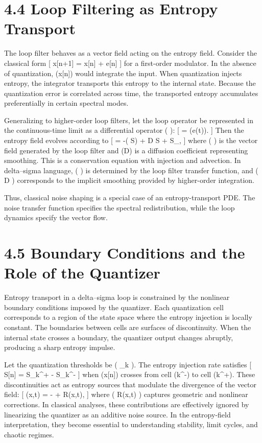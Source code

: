 \section*{4.4 Loop Filtering as Entropy Transport}

The loop filter behaves as a vector field acting on the entropy field. Consider the classical form
[
x[n+1] = x[n] + e[n]
]
for a first-order modulator. In the absence of quantization, (x[n]) would integrate the input. When quantization injects entropy, the integrator transports this entropy to the internal state. Because the quantization error is correlated across time, the transported entropy accumulates preferentially in certain spectral modes.

Generalizing to higher-order loop filters, let the loop operator be represented in the continuous-time limit as a differential operator (  ):
[
 = (e(t)).
]
Then the entropy field evolves according to
[
 = -\nabla \cdot ( S) + D \Delta S + \Delta S_{},
]
where (  ) is the vector field generated by the loop filter and (D) is a diffusion coefficient representing smoothing. This is a conservation equation with injection and advection. In delta--sigma language, (  ) is determined by the loop filter transfer function, and ( D ) corresponds to the implicit smoothing provided by higher-order integration.

Thus, classical noise shaping is a special case of an entropy-transport PDE. The noise transfer function specifies the spectral redistribution, while the loop dynamics specify the vector flow.

\section*{4.5 Boundary Conditions and the Role of the Quantizer}

Entropy transport in a delta--sigma loop is constrained by the nonlinear boundary conditions imposed by the quantizer. Each quantization cell corresponds to a region of the state space where the entropy injection is locally constant. The boundaries between cells are surfaces of discontinuity. When the internal state crosses a boundary, the quantizer output changes abruptly, producing a sharp entropy impulse.

Let the quantization thresholds be ( {\tau_k} ). The entropy injection rate satisfies
[
\Delta S[n] = S_{k^+} - S_{k^-}
]
when (x[n]) crosses from cell (k^-) to cell (k^+). These discontinuities act as entropy sources that modulate the divergence of the vector field:
[
\nabla \cdot {}(x,t) = - + R(x,t),
]
where ( R(x,t) ) captures geometric and nonlinear corrections. In classical analyses, these contributions are effectively ignored by linearizing the quantizer as an additive noise source. In the entropy-field interpretation, they become essential to understanding stability, limit cycles, and chaotic regimes.

